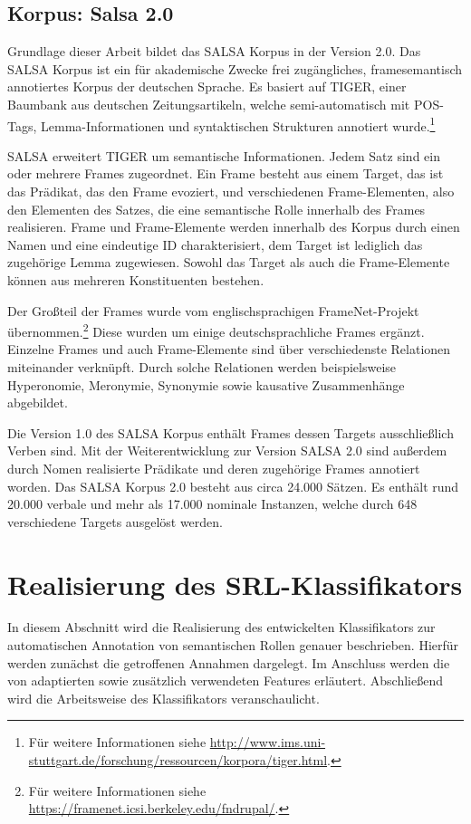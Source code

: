 \documentclass[12pt]{article}
\begin{document}
\subsection{Korpus: Salsa 2.0}
Grundlage dieser Arbeit bildet das SALSA Korpus in der Version 2.0. Das SALSA Korpus ist ein für akademische Zwecke frei zugängliches, framesemantisch annotiertes Korpus der deutschen Sprache. Es basiert auf TIGER\citep{brants_tiger_2002, tiger}, einer Baumbank aus deutschen Zeitungsartikeln, welche semi-automatisch mit POS-Tags, Lemma-Informationen und syntaktischen Strukturen annotiert wurde.\footnote{Für weitere Informationen siehe \url{http://www.ims.uni-stuttgart.de/forschung/ressourcen/korpora/tiger.html}.}

SALSA erweitert TIGER um semantische Informationen. Jedem Satz sind ein oder mehrere Frames zugeordnet. Ein Frame besteht aus einem Target, das ist das Prädikat, das den Frame evoziert, und verschiedenen Frame-Elementen, also den Elementen des Satzes, die eine semantische Rolle innerhalb des Frames realisieren. Frame und Frame-Elemente werden innerhalb des Korpus durch einen Namen und eine eindeutige ID charakterisiert, dem Target ist lediglich das zugehörige Lemma zugewiesen. Sowohl das Target als auch die Frame-Elemente können aus mehreren Konstituenten bestehen.

Der Großteil der Frames wurde vom englischsprachigen FrameNet-Projekt\citep{baker_berkeley_1998} übernommen.\footnote{Für weitere Informationen siehe \url{https://framenet.icsi.berkeley.edu/fndrupal/}.} Diese wurden um einige deutschsprachliche Frames ergänzt. Einzelne Frames und auch Frame-Elemente sind über verschiedenste Relationen miteinander verknüpft. Durch solche Relationen werden beispielsweise Hyperonomie, Meronymie, Synonymie sowie kausative Zusammenhänge abgebildet.

Die Version 1.0 des SALSA Korpus\citep{burchardt_salsa_2006} enthält Frames dessen Targets ausschließlich Verben sind. Mit der Weiterentwicklung zur Version SALSA 2.0\citep{rehbein_adding_2012} sind außerdem durch Nomen realisierte Prädikate und deren zugehörige Frames annotiert worden. Das SALSA Korpus 2.0 besteht aus circa 24.000 Sätzen. Es enthält rund 20.000 verbale und mehr als 17.000 nominale Instanzen, welche durch 648 verschiedene Targets ausgelöst werden.

\section{Realisierung des SRL-Klassifikators}
In diesem Abschnitt wird die Realisierung des entwickelten Klassifikators zur automatischen Annotation von semantischen Rollen genauer beschrieben. Hierfür werden zunächst die getroffenen Annahmen dargelegt. Im Anschluss werden die von \cite{gildea} adaptierten sowie zusätzlich verwendeten Features erläutert. Abschließend wird die Arbeitsweise des Klassifikators veranschaulicht.
\end{document}
